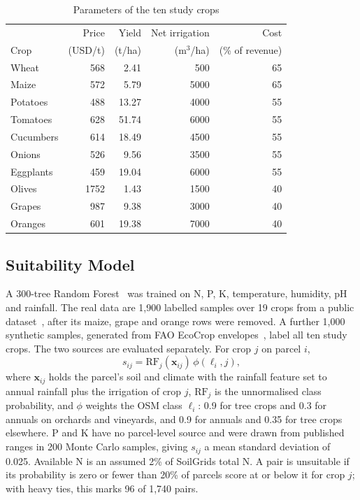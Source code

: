 \begin{table}[t]
\centering
\caption{Parameters of the ten study crops}
\label{tab:crops}
\footnotesize
\begin{tabular}{lrrrr}
\toprule
 & Price & Yield & Net irrigation & Cost \\
Crop & (USD/t) & (t/ha) & (m$^3$/ha) & (\% of revenue) \\
\midrule
Wheat     &  568 &  2.41 &  500 & 65 \\
Maize     &  572 &  5.79 & 5000 & 65 \\
\midrule
Potatoes  &  488 & 13.27 & 4000 & 55 \\
Tomatoes  &  628 & 51.74 & 6000 & 55 \\
Cucumbers &  614 & 18.49 & 4500 & 55 \\
Onions    &  526 &  9.56 & 3500 & 55 \\
Eggplants &  459 & 19.04 & 6000 & 55 \\
\midrule
Olives    & 1752 &  1.43 & 1500 & 40 \\
Grapes    &  987 &  9.38 & 3000 & 40 \\
Oranges   &  601 & 19.38 & 7000 & 40 \\
\bottomrule
\end{tabular}
\end{table}

\subsection{Suitability Model}
A 300-tree Random Forest~\cite{breiman2001} was trained on N, P, K,
temperature, humidity, pH and rainfall. The real data are 1{,}900 labelled
samples over 19 crops from a public dataset~\cite{kagglecrop}, after its
maize, grape and orange rows were removed. A further 1{,}000 synthetic
samples, generated from FAO EcoCrop envelopes~\cite{ecocrop}, label all ten
study crops. The two sources are evaluated separately. For crop $j$ on
parcel $i$,
\begin{equation}
s_{ij} = \mathrm{RF}_j(\mathbf{x}_{ij})\,\phi(\ell_i, j),
\label{eq:suit}
\end{equation}
where $\mathbf{x}_{ij}$ holds the parcel's soil and climate with the
rainfall feature set to annual rainfall plus the irrigation of crop $j$,
$\mathrm{RF}_j$ is the unnormalised class probability, and $\phi$ weights
the OSM class $\ell_i$: 0.9 for tree crops and 0.3 for annuals on orchards
and vineyards, and 0.9 for annuals and 0.35 for tree crops elsewhere. P and
K have no parcel-level source and were drawn from published ranges in 200
Monte Carlo samples, giving $s_{ij}$ a mean standard deviation of 0.025.
Available N is an assumed 2\% of SoilGrids total N. A pair is unsuitable if
its probability is zero or fewer than 20\% of parcels score at or below
it for crop $j$; with heavy ties, this marks 96 of 1{,}740 pairs.

